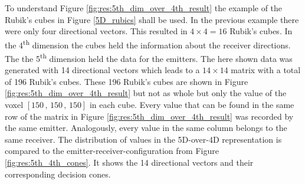 To understand Figure \ref{fig:res:5th_dim_over_4th_result} the example of the Rubik's cubes in Figure \ref{5D_rubics} shall be used. In the previous example there were only four directional vectors. This resulted in $4 \times 4 = 16$ Rubik's cubes. In the 4\textsuperscript{th} dimension the cubes held the information about the receiver directions. The the 5\textsuperscript{th} dimension held the data for the emitters. The here shown data was generated with 14 directional vectors which leads to a $14 \times 14$ matrix with a total of 196 Rubik's cubes. These 196 Rubik's cubes are shown in Figure \ref{fig:res:5th_dim_over_4th_result} but not as whole but only the value of the voxel $[150\, , \, 150\, , \, 150]$ in each cube.
Every value that can be found in the same row of the matrix in Figure \ref{fig:res:5th_dim_over_4th_result} was recorded by the same emitter. Analogously, every value in the same column belongs to the same receiver. The distribution of values in the 5D-over-4D representation is compared to the emitter-receiver-configuration from Figure \ref{fig:res:5th_4th_cones}. It shows the 14 directional vectors and their corresponding decision cones.


